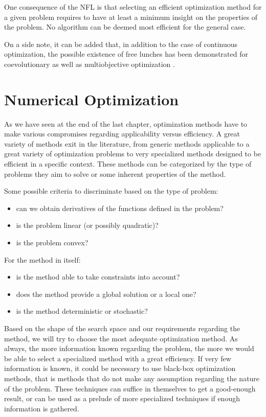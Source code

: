 One consequence of the NFL is that selecting an efficient optimization method for a given problem requires to have at least a minimum insight on the properties of the problem. No algorithm can be deemed most efficient for the general case.

On a side note, it can be added that, in addition to the case of continuous optimization, the possible existence of free lunches has been demonstrated for coevolutionary \cite{1545946} as well as multiobjective optimization \cite{1299403}.

\chapter{Numerical Optimization}

As we have seen at the end of the last chapter, optimization methods have to make various compromises regarding applicability versus efficiency.  A great variety of methods exit in the literature, from generic methods applicable to a great variety of optimization problems to very specialized methods designed to be efficient in a specific context. These methods can be categorized by the type of problems they aim to solve or some inherent properties of the method.

Some possible criteria to discriminate based on the type of problem:
\begin{itemize}
\item can we obtain derivatives of the functions defined in the problem?
\item is the problem linear (or possibly quadratic)?
\item is the problem convex?
\end{itemize}

For the method in itself:
\begin{itemize}
\item is the method able to take constraints into account?
\item does the method provide a global solution or a local one?
\item is the method deterministic or stochastic?
\end{itemize}

Based on the shape of the search space and our requirements regarding the method, we will try to choose the most adequate optimization method. As always, the more information known regarding the problem, the more we would be able to select a specialized method with a great efficiency. If very few information is known, it could be necessary to use black-box optimization methods, that is methods that do not make any assumption regarding the nature of the problem. These techniques can suffice in themselves to get a good-enough result, or can be used as a prelude of more specialized techniques if enough information is gathered.

